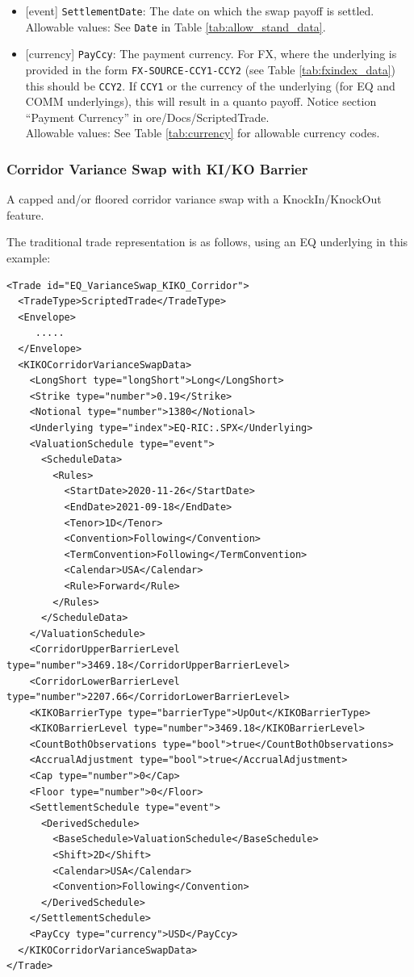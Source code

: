 \begin{itemize}
  Allowable values: Any non-negative number.
  The full set of allowable values is given in Table \ref{tab:boolean_allowable}.
  \item{}[event] \lstinline!SettlementDate!: The date on which the swap payoff is settled. \\
  Allowable values: See \lstinline!Date! in Table \ref{tab:allow_stand_data}.
  \item{}[currency] \lstinline!PayCcy!: The payment currency. For FX, where the underlying is provided
      in the form \lstinline!FX-SOURCE-CCY1-CCY2! (see Table \ref{tab:fxindex_data}) this should
      be \lstinline!CCY2!. If \lstinline!CCY1! or the currency of the underlying (for EQ and
      COMM underlyings), this will result in a quanto payoff. Notice section ``Payment Currency'' in ore/Docs/ScriptedTrade. \\
        Allowable values: See Table \ref{tab:currency}  for allowable currency codes.
\end{itemize}

\subsubsection{Corridor Variance Swap with KI/KO Barrier}

A capped and/or floored corridor variance swap with a KnockIn/KnockOut feature.

The traditional trade representation is as follows, using an EQ underlying in this example:

\begin{verbatim}
<Trade id="EQ_VarianceSwap_KIKO_Corridor">
  <TradeType>ScriptedTrade</TradeType>
  <Envelope>
     .....
  </Envelope>
  <KIKOCorridorVarianceSwapData>
    <LongShort type="longShort">Long</LongShort>
    <Strike type="number">0.19</Strike>
    <Notional type="number">1380</Notional>
    <Underlying type="index">EQ-RIC:.SPX</Underlying>
    <ValuationSchedule type="event">
      <ScheduleData>
        <Rules>
          <StartDate>2020-11-26</StartDate>
          <EndDate>2021-09-18</EndDate>
          <Tenor>1D</Tenor>
          <Convention>Following</Convention>
          <TermConvention>Following</TermConvention>
          <Calendar>USA</Calendar>
          <Rule>Forward</Rule>
        </Rules>
      </ScheduleData>
    </ValuationSchedule>
    <CorridorUpperBarrierLevel type="number">3469.18</CorridorUpperBarrierLevel>
    <CorridorLowerBarrierLevel type="number">2207.66</CorridorLowerBarrierLevel>
    <KIKOBarrierType type="barrierType">UpOut</KIKOBarrierType>
    <KIKOBarrierLevel type="number">3469.18</KIKOBarrierLevel>
    <CountBothObservations type="bool">true</CountBothObservations>
    <AccrualAdjustment type="bool">true</AccrualAdjustment>
    <Cap type="number">0</Cap>
    <Floor type="number">0</Floor>
    <SettlementSchedule type="event">
      <DerivedSchedule>
        <BaseSchedule>ValuationSchedule</BaseSchedule>
        <Shift>2D</Shift>
        <Calendar>USA</Calendar>
        <Convention>Following</Convention>
      </DerivedSchedule>
    </SettlementSchedule>
    <PayCcy type="currency">USD</PayCcy>
  </KIKOCorridorVarianceSwapData>
</Trade>
\end{verbatim}

